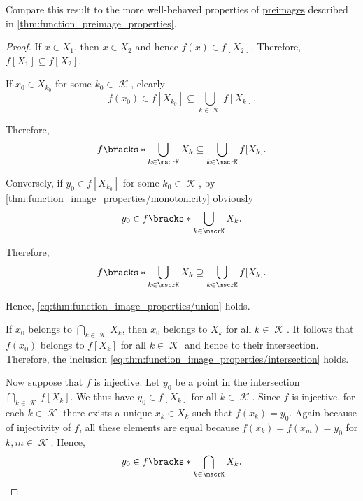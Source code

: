 \begin{comments}
  \item Compare this result to the more well-behaved properties of \hyperref[def:set_valued_function/inverse]{preimages} described in \cref{thm:function_preimage_properties}.
\end{comments}
\begin{proof}
   If \( x \in X_1 \), then \( x \in X_2 \) and hence \( f(x) \in f[X_2] \). Therefore, \( f[X_1] \subseteq f[X_2] \).

   If \( x_0 \in X_{k_0} \) for some \( k_0 \in \mscrK \), clearly
  \begin{equation*}
    f(x_0) \in f[X_{k_0}] \subseteq \bigcup_{k \in \mscrK} f[X_k].
  \end{equation*}

  Therefore,
  \begin{equation*}
    f\bracks*{ \bigcup_{k \in \mscrK} X_k } \subseteq \bigcup_{k \in \mscrK} f[X_k].
  \end{equation*}

  Conversely, if \( y_0 \in f[X_{k_0}] \) for some \( k_0 \in \mscrK \), by \cref{thm:function_image_properties/monotonicity} obviously
  \begin{equation*}
    y_0 \in f\bracks*{ \bigcup_{k \in \mscrK} X_k }.
  \end{equation*}

  Therefore,
  \begin{equation*}
    f\bracks*{ \bigcup_{k \in \mscrK} X_k } \supseteq \bigcup_{k \in \mscrK} f[X_k].
  \end{equation*}

  Hence, \eqref{eq:thm:function_image_properties/union} holds.

   If \( x_0 \) belongs to \( \bigcap_{k \in \mscrK} X_k \), then \( x_0 \) belongs to \( X_k \) for all \( k \in \mscrK \). It follows that \( f(x_0) \) belongs to \( f[X_k] \) for all \( k \in \mscrK \) and hence to their intersection. Therefore, the inclusion \eqref{eq:thm:function_image_properties/intersection} holds.

  Now suppose that \( f \) is injective. Let \( y_0 \) be a point in the intersection \( \bigcap_{k \in \mscrK} f[X_k] \). We thus have \( y_0 \in f[X_k] \) for all \( k \in \mscrK \). Since \( f \) is injective, for each \( k \in \mscrK \) there exists a unique \( x_k \in X_k \) such that \( f(x_k) = y_0 \). Again because of injectivity of \( f \), all these elements are equal because \( f(x_k) = f(x_m) = y_0 \) for \( k, m \in \mscrK \). Hence,
  \begin{equation*}
    y_0 \in f\bracks*{ \bigcap_{k \in \mscrK} X_k }.
  \end{equation*}


\end{proof}

